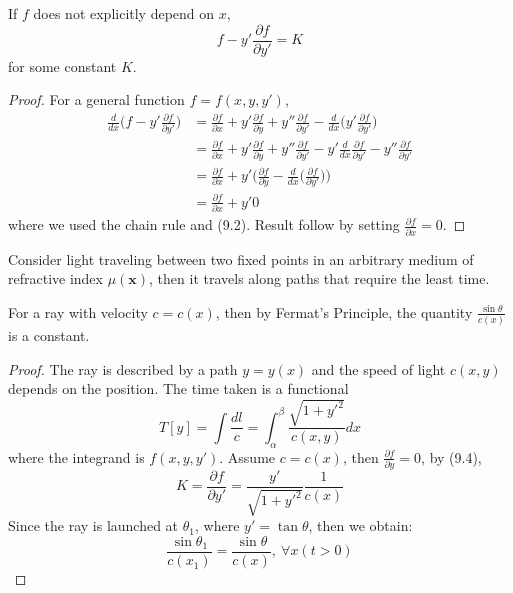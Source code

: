\documentclass[a4paper]{article}
\begin{document}
\begin{cor}
If $f$ does not explicitly depend on $x$,
\begin{equation}
    f-y'\frac{\partial f}{\partial y'}=K\tag{9.4}
\end{equation}
for some constant $K$.
\end{cor}
\begin{proof}
For a general function $f=f(x,y,y')$,
\begin{align}
\frac{d}{dx}\bigg(f-y'\frac{\partial f}{\partial y'}\bigg)&=\frac{\partial f}{\partial x}+y'\frac{\partial f}{\partial y}+y''\frac{\partial f}{\partial y'}-\frac{d}{dx}\bigg(y'\frac{\partial f}{\partial y'}\bigg)\nonumber\\&=\frac{\partial f}{\partial x}+y'\frac{\partial f}{\partial y}+y''\frac{\partial f}{\partial y'}-y'\frac{d}{dx}\frac{\partial f}{\partial y'}-y''\frac{\partial f}{\partial y'}\nonumber\\&=\frac{\partial f}{\partial x}+y'\bigg(\frac{\partial f}{\partial y}-\frac{d}{dx}\bigg(\frac{\partial f}{\partial y'}\bigg)\bigg)\nonumber\\&=\frac{\partial f}{\partial x}+y'0\nonumber
\end{align}
where we used the chain rule and (9.2). Result follow by setting $\frac{\partial f}{\partial x}=0$.
\end{proof}
\begin{prop}
Consider light traveling between two fixed points in an arbitrary medium of refractive index $\mu(\mathbf{x})$, then it travels along paths that require the least time.
\end{prop}
\begin{prop}
For a ray with velocity $c=c(x)$, then by Fermat's Principle, the quantity $\frac{\sin\theta}{c(x)}$ is a constant.
\end{prop}
\begin{proof}
The ray is described by a path $y=y(x)$ and the speed of light $c(x,y)$ depends on the position. The time taken is a functional
$$T[y]=\int\frac{dl}{c}=\int_\alpha^\beta\frac{\sqrt{1+y'^2}}{c(x,y)}dx$$
where the integrand is $f(x,y,y')$. Assume $c=c(x)$, then $\frac{\partial f}{\partial y}=0$, by (9.4), 
$$K=\frac{\partial f}{\partial y'}=\frac{y'}{\sqrt{1+y'^2}}\frac{1}{c(x)}$$
Since the ray is launched at $\theta_1$, where $y'=\tan\theta$, then we obtain:
\begin{equation}
    \frac{\sin\theta_1}{c(x_1)}=\frac{\sin\theta}{c(x)},~\forall x(t>0)\tag{9.5}
\end{equation}
\end{proof}
\end{document}
